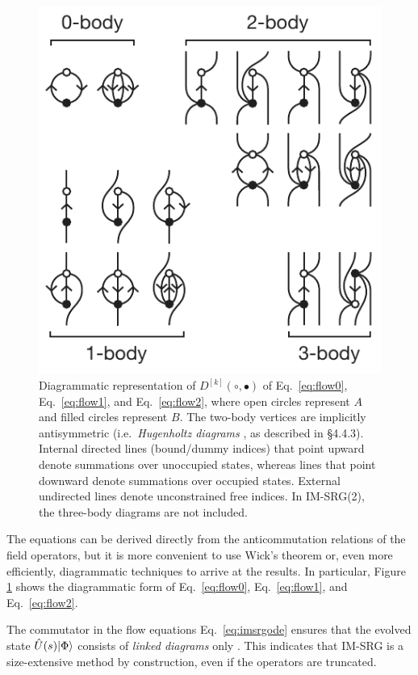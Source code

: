 \begin{figure}
\includegraphics{fig-diagrams-imsrg.pdf}
\caption{Diagrammatic representation of $D^{[k]}(\circ, \bullet)$ of Eq.\ \eqref{eq:flow0}, Eq.\ \eqref{eq:flow1}, and Eq.\ \eqref{eq:flow2}, where open circles represent $A$ and filled circles represent $B$.  The two-body vertices are implicitly antisymmetric (i.e.\ \textit{Hugenholtz diagrams} \cite{HUGENHOLTZ1957481}, as described in \cite{shavitt2009many} \S 4.4.3).  Internal directed lines (bound/dummy indices) that point upward denote summations over unoccupied states, whereas lines that point downward denote summations over occupied states.  External undirected lines denote unconstrained free indices.  In IM-SRG(2), the three-body diagrams are not included.}
\label{fig:diagrams-imsrg}
\end{figure}

The equations can be derived directly from the anticommutation relations of the field operators, but it is more convenient to use Wick's theorem \cite{PhysRev.80.268} or, even more efficiently, diagrammatic techniques \cite{shavitt2009many} to arrive at the results.  In particular, Figure \ref{fig:diagrams-imsrg} shows the diagrammatic form of Eq.\ \eqref{eq:flow0}, Eq.\ \eqref{eq:flow1}, and Eq.\ \eqref{eq:flow2}.

The commutator in the flow equations Eq.\ \eqref{eq:imsrgode} ensures that the evolved state $\hat U(s) | \Phi \rangle$ consists of \emph{linked diagrams} only \cite{shavitt2009many}.  This indicates that IM-SRG is a size-extensive \cite{ISI:A1981MN73700014} method by construction, even if the operators are truncated.


